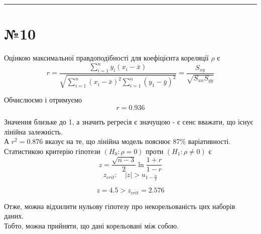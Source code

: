 \documentclass[11pt, a4paper]{article} %
\begin{document}
\noindent\rule{\textwidth}{0.4pt}

\section*{№10}
Оцінкою максимальної правдоподібності для коефіцієнта кореляції $\rho$ є
$$r = \frac{\sum_{i=1}^n y_i (x_i-\bar x)}{\sqrt{\sum_{i=1}^n(x_i-\bar x)^2 \sum_{i=1}^n (y_1-\bar y)^2}} = \frac{S_{xy}}{\sqrt{S_{xx}S_{yy}}}$$

Обчислюємо і отримуємо
$$r = 0.936$$

Значення близьке до 1, а значить регресія є значущою - є сенс вважати, що існує лінійна залежність.\\
А $r^2 = 0.876$ вказує на те, що лінійна модель пояснює 87\% варіативності.\\  

Статистикою критерію гіпотези $(H_0: \rho = 0)$ проти $(H_1 : \rho \ne 0)$  є
$$z = \frac{\sqrt{n-3}}{2}\ln \frac{1+r}{1-r}$$
$$z_{crit}: \quad |z| > u_{1-\frac{\alpha}{2}}$$

$$z = 4.5 > z_{crit} = 2.576$$

Отже, можна відхилити нульову гіпотезу про некорельованість цих наборів даних. \\
Тобто, можна прийняти, що дані корельовані між собою.
\end{document}
